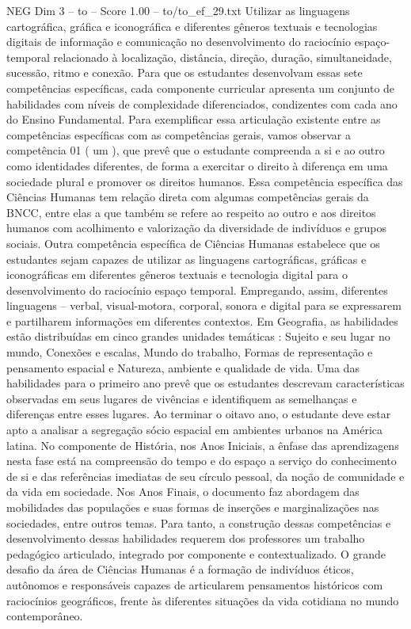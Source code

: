 \begin{textsample}{NEG Dim 3 – to – Score 1.00 – to/to\_ef\_29.txt}
Utilizar as linguagens cartográfica, gráfica e iconográfica e diferentes gêneros textuais e tecnologias digitais de informação e comunicação no desenvolvimento do raciocínio espaço-temporal relacionado à localização, distância, direção, duração, simultaneidade, sucessão, ritmo e conexão.
Para que os estudantes desenvolvam essas sete competências específicas, cada componente curricular apresenta um conjunto de habilidades com níveis de complexidade diferenciados, condizentes com cada ano do Ensino Fundamental.
Para exemplificar essa articulação existente entre as competências específicas com as competências gerais, vamos observar a competência 01 ( um ), que prevê que o estudante compreenda a si e ao outro como identidades diferentes, de forma a exercitar o direito à diferença em uma sociedade plural e promover os direitos humanos.
Essa competência específica das Ciências Humanas tem relação direta com algumas competências gerais da BNCC, entre elas a que também se refere ao respeito ao outro e aos direitos humanos com acolhimento e valorização da diversidade de indivíduos e grupos sociais.
Outra competência específica de Ciências Humanas estabelece que os estudantes sejam capazes de utilizar as linguagens cartográficas, gráficas e iconográficas em diferentes gêneros textuais e tecnologia digital para o desenvolvimento do raciocínio espaço temporal.
Empregando, assim, diferentes linguagens – verbal, visual-motora, corporal, sonora e digital para se expressarem e partilharem informações em diferentes contextos.
Em Geografia, as habilidades estão distribuídas em cinco grandes unidades temáticas : Sujeito e seu lugar no mundo, Conexões e escalas, Mundo do trabalho, Formas de representação e pensamento espacial e Natureza, ambiente e qualidade de vida.
Uma das habilidades para o primeiro ano prevê que os estudantes descrevam características observadas em seus lugares de vivências e identifiquem as semelhanças e diferenças entre esses lugares.
Ao terminar o oitavo ano, o estudante deve estar apto a analisar a segregação sócio espacial em ambientes urbanos na América latina.
No componente de História, nos Anos Iniciais, a ênfase das aprendizagens nesta fase está na compreensão do tempo e do espaço a serviço do conhecimento de si e das referências imediatas de seu círculo pessoal, da noção de comunidade e da vida em sociedade.
Nos Anos Finais, o documento faz abordagem das mobilidades das populações e suas formas de inserções e marginalizações nas sociedades, entre outros temas.
Para tanto, a construção dessas competências e desenvolvimento dessas habilidades requerem dos professores um trabalho pedagógico articulado, integrado por componente e contextualizado.
O grande desafio da área de Ciências Humanas é a formação de indivíduos éticos, autônomos e responsáveis capazes de articularem pensamentos históricos com raciocínios geográficos, frente às diferentes situações da vida cotidiana no mundo contemporâneo.

\end{textsample}
